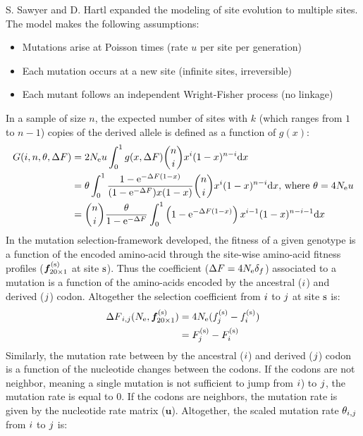 S. Sawyer and D. Hartl expanded the modeling of site evolution to multiple sites.
The model makes the following assumptions: 
\begin{itemize}
	\setlength\itemsep{-0.2em}
	\item Mutations arise at Poisson times (rate $u$ per site per generation)
	\item Each mutation occurs at a new site (infinite sites, irreversible)
	\item Each mutant follows an independent Wright-Fisher process (no linkage)
\end{itemize}
In a sample of size $n$, the expected number of sites with $k$ (which ranges from $1$ to $n-1$) copies of the derived allele is defined as a function of $g(x)$:
\begin{align}
G(i, n, \theta, {\Delta F}) & = 2 N_{\textrm{e}} u \int_{0}^{1} g(x, {\Delta F}) \binom{n}{i} x^{i} (1-x)^{n-i} \mathrm{d} x \nonumber \\
& = \theta \int_{0}^{1} \dfrac{1 - \mathrm{e}^{-{\Delta F} (1-x)}}{(1 - \mathrm{e}^{-{\Delta F}})x(1-x)} \binom{n}{i} x^{i} (1-x)^{n-i} \mathrm{d} x\text{, where } \theta=4N_{\textrm{e}} u \nonumber \\
& = \binom{n}{i} \dfrac{\theta }{1 - \mathrm{e}^{-{\Delta F}}} \int_{0}^{1} \left( 1 - \mathrm{e}^{-{\Delta F} (1-x)} \right) x^{i-1} (1-x)^{n-i-1} \mathrm{d} x
\end{align}
In the mutation selection-framework developed, the fitness of a given genotype is a function of the encoded amino-acid through the site-wise amino-acid fitness profiles ($ \bm{f}_{20\times1}^{(\text{s})} $ at site $\text{s}$). Thus the coefficient (${\Delta F}=4N_{\textrm{e}} {\delta_{f}} $) associated to a mutation is a function of the amino-acids encoded by the ancestral (${i}$) and derived (${j}$) codon. Altogether the selection coefficient from ${i}$ to ${j}$ at site $\text{s}$ is:
\begin{align}
{\Delta F}_{{i}, {j}}(N_{\textrm{e}}, \bm{f}_{20\times1}^{(\text{s})}) &= 4 N_{\textrm{e}} (f_{j}^{(\text{s})}-f_{i}^{(\text{s})}) \nonumber \\
& = F_{j}^{(\text{s})}-F_{i}^{(\text{s})}
\end{align}
Similarly, the mutation rate between by the ancestral (${i}$) and derived (${j}$) codon is a function of the nucleotide changes between the codons. If the codons are not neighbor, meaning a single mutation is not sufficient to jump from ${i}$) to ${j}$, the mutation rate is equal to $0$. If the codons are neighbors, the mutation rate is given by the nucleotide rate matrix ($ \bm{u} $). Altogether, the scaled mutation rate $\theta_{{i}, {j}}$ from ${i}$ to ${j}$ is:
